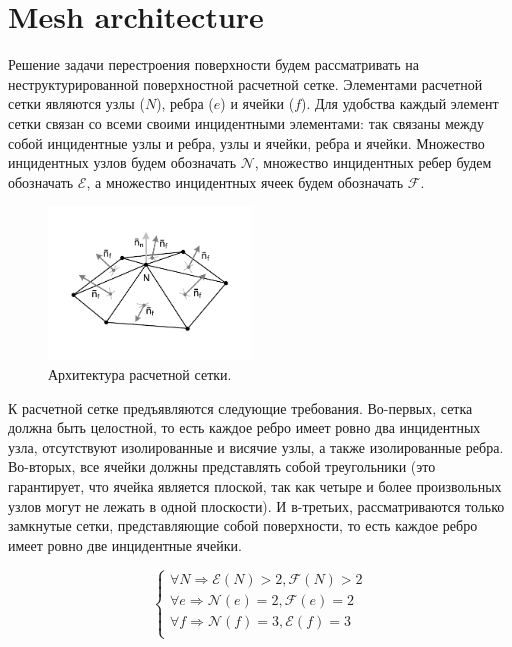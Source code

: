 \documentclass[
11pt,%
tightenlines,%
twoside,%
onecolumn,%
nofloats,%
nobibnotes,%
nofootinbib,%
superscriptaddress,%
noshowpacs,%
centertags]%
{revtex4}
\begin{document}

\section{Mesh architecture}

Решение задачи перестроения поверхности будем рассматривать на неструктурированной поверхностной расчетной сетке.
Элементами расчетной сетки являются узлы ($N$), ребра ($e$)  и ячейки ($f$).
Для удобства каждый элемент сетки связан со всеми своими инцидентными элементами: так связаны между собой инцидентные узлы и ребра, узлы и ячейки, ребра и ячейки. Множество инцидентных узлов будем обозначать $\mathscr{N}$, множество инцидентных ребер будем обозначать $\mathscr{E}$, а множество инцидентных ячеек будем обозначать $\mathscr{F}$.

\begin{figure}[h]
\includegraphics[width=0.48\textwidth]{pics/pic_architecture_size.pdf}
\caption{Архитектура расчетной сетки.}\label{fig:pic_architecture}
\end{figure}

К расчетной сетке предъявляются следующие требования.
Во-первых, сетка должна быть целостной, то есть каждое ребро имеет ровно два инцидентных узла, отсутствуют изолированные и висячие узлы, а также изолированные ребра.
Во-вторых, все ячейки должны представлять собой треугольники (это гарантирует, что ячейка является плоской, так как четыре и более произвольных узлов могут не лежать в одной плоскости).
И в-третьих, рассматриваются только замкнутые сетки, представляющие собой поверхности, то есть каждое ребро имеет ровно две инцидентные ячейки.

\begin{equation}\label{eq_arch}
\begin{cases}
\forall N \Rightarrow \mathscr{E}(N) > 2, \mathscr{F}(N) > 2 \\
\forall e \Rightarrow \mathscr{N}(e) = 2 , \mathscr{F}(e) = 2 \\
\forall f \Rightarrow \mathscr{N}(f) = 3 , \mathscr{E}(f) = 3 \\
\end{cases}
\end{equation}
\end{document}
